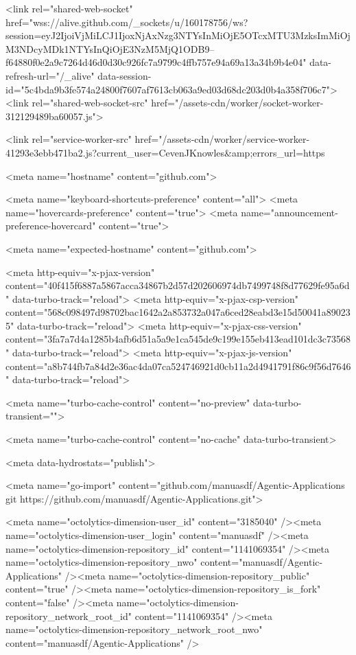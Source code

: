       <link rel="shared-web-socket" href="wss://alive.github.com/_sockets/u/160178756/ws?session=eyJ2IjoiVjMiLCJ1IjoxNjAxNzg3NTYsInMiOjE5OTcxMTU3MzksImMiOjM3NDcyMDk1NTYsInQiOjE3NzM5MjQ1ODB9--f64880f0e2a9c7264d46d0d30c926fc7a9799c4ffb757e94a69a13a34b9b4e04" data-refresh-url="/_alive" data-session-id="5c4bda9b3fe574a24800f7607af7613cb063a9ed03d68dc203d0b4a358f706c7">
      <link rel="shared-web-socket-src" href="/assets-cdn/worker/socket-worker-312129489ba60057.js">

      <link rel="service-worker-src" href="/assets-cdn/worker/service-worker-41293e3ebb471ba2.js?current_user=CevenJKnowles&amp;errors_url=https%

      <meta name="hostname" content="github.com">


      <meta name="keyboard-shortcuts-preference" content="all">
      <meta name="hovercards-preference" content="true">
      <meta name="announcement-preference-hovercard" content="true">

        <meta name="expected-hostname" content="github.com">


  <meta http-equiv="x-pjax-version" content="40f415f6887a5867acca34867b2d57d202606974db7499748f8d77629fe95a6d" data-turbo-track="reload">
  <meta http-equiv="x-pjax-csp-version" content="568c098497d98702bac1642a2a853732a047a6ced28eabd3e15d50041a890235" data-turbo-track="reload">
  <meta http-equiv="x-pjax-css-version" content="3fa7a7d4a1285b4afb6d51a5a9e1ca545de9c199e155eb413ead101dc3c73568" data-turbo-track="reload">
  <meta http-equiv="x-pjax-js-version" content="a8b744fb7a84d2e36ac4da07ca524746921d0cb11a2d4941791f86c9f56d7646" data-turbo-track="reload">

  <meta name="turbo-cache-control" content="no-preview" data-turbo-transient="">

      <meta name="turbo-cache-control" content="no-cache" data-turbo-transient>

    <meta data-hydrostats="publish">

  <meta name="go-import" content="github.com/manuasdf/Agentic-Applications git https://github.com/manuasdf/Agentic-Applications.git">

  <meta name="octolytics-dimension-user_id" content="3185040" /><meta name="octolytics-dimension-user_login" content="manuasdf" /><meta name="octolytics-dimension-repository_id" content="1141069354" /><meta name="octolytics-dimension-repository_nwo" content="manuasdf/Agentic-Applications" /><meta name="octolytics-dimension-repository_public" content="true" /><meta name="octolytics-dimension-repository_is_fork" content="false" /><meta name="octolytics-dimension-repository_network_root_id" content="1141069354" /><meta name="octolytics-dimension-repository_network_root_nwo" content="manuasdf/Agentic-Applications" />



